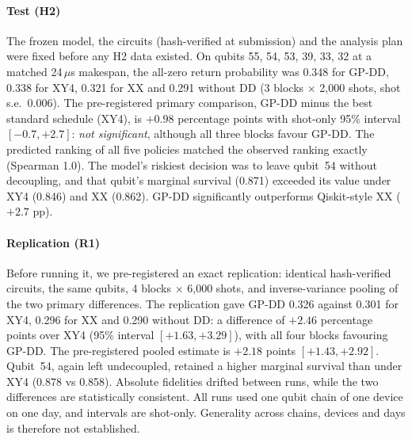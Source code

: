 \documentclass[10pt,journal]{IEEEtran}
\theoremstyle{remark}
\begin{document}
\paragraph*{Test (H2)}
The frozen model, the circuits (hash-verified at submission) and the analysis plan were fixed before any H2 data
existed. On qubits 55, 54, 53, 39, 33, 32 at a matched 24\,$\mu$s makespan, the all-zero return probability was
0.348 for GP-DD, 0.338 for XY4, 0.321 for XX and 0.291 without DD (3 blocks $\times$ 2{,}000 shots, shot s.e.\
0.006). The pre-registered primary comparison, GP-DD minus the best standard schedule (XY4), is $+0.98$ percentage
points with shot-only 95\% interval $[-0.7, +2.7]$: \emph{not significant}, although all three blocks favour GP-DD.
The predicted ranking of all five policies matched the observed ranking exactly (Spearman 1.0). The model's
riskiest decision was to leave qubit~54 without decoupling, and that qubit's marginal survival (0.871) exceeded its
value under XY4 (0.846) and XX (0.862). GP-DD significantly outperforms Qiskit-style XX ($+2.7$ pp).

\paragraph*{Replication (R1)}
Before running it, we pre-registered an exact replication: identical hash-verified circuits, the same qubits,
4 blocks $\times$ 6{,}000 shots, and inverse-variance pooling of the two primary differences. The replication
gave GP-DD 0.326 against 0.301 for XY4, 0.296 for XX and 0.290 without DD: a difference of $+2.46$ percentage points
over XY4 (95\% interval $[+1.63, +3.29]$), with all four blocks favouring GP-DD. The pre-registered pooled
estimate is $+2.18$ points $[+1.43, +2.92]$. Qubit~54, again left undecoupled, retained a higher marginal survival
than under XY4 (0.878 vs 0.858). Absolute fidelities drifted between runs, while the two differences are
statistically consistent. All runs used one qubit chain of one device on one day, and intervals are shot-only.
Generality across chains, devices and days is therefore not established.
\end{document}
